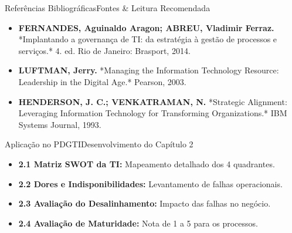 \begin{senaiframe}{Referências Bibliográficas}{Fontes \& Leitura Recomendada}
  \begin{tcolorbox}[senaicard, title={Obras de Referência}]
    \begin{itemize}
      \item \textbf{FERNANDES, Aguinaldo Aragon; ABREU, Vladimir Ferraz.} *Implantando a governança de TI: da estratégia à gestão de processos e serviços.* 4. ed. Rio de Janeiro: Brasport, 2014.
      \item \textbf{LUFTMAN, Jerry.} *Managing the Information Technology Resource: Leadership in the Digital Age.* Pearson, 2003.
      \item \textbf{HENDERSON, J. C.; VENKATRAMAN, N.} *Strategic Alignment: Leveraging Information Technology for Transforming Organizations.* IBM Systems Journal, 1993.
    \end{itemize}
  \end{tcolorbox}
\end{senaiframe}

\begin{senaiframe}{Aplicação no PDGTI}{Desenvolvimento do Capítulo 2}
  \vspace{0.2cm}
  \begin{tcolorbox}[senaigreencard, title={Capítulo 2 – Diagnóstico da Situação Atual}]
    \begin{itemize}
      \item \textbf{2.1 Matriz SWOT da TI:} Mapeamento detalhado dos 4 quadrantes.
      \item \textbf{2.2 Dores e Indisponibilidades:} Levantamento de falhas operacionais.
      \item \textbf{2.3 Avaliação do Desalinhamento:} Impacto das falhas no negócio.
      \item \textbf{2.4 Avaliação de Maturidade:} Nota de 1 a 5 para os processos.
    \end{itemize}
  \end{tcolorbox}
\end{senaiframe}
